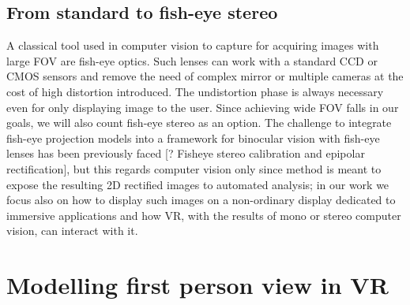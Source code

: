 \subsection{From standard to fish-eye stereo}
A classical tool used in computer vision to capture for acquiring images with large FOV are fish-eye optics. Such lenses can work with a standard CCD or CMOS sensors and remove the need of complex mirror or multiple cameras at the cost of high distortion introduced. The undistortion phase is always necessary even for only displaying image to the user. Since achieving wide FOV falls in our goals, we will also count fish-eye stereo as an option. The challenge to integrate fish-eye projection models into a framework for binocular vision with fish-eye lenses has been previously faced [? Fisheye stereo calibration and epipolar rectification], but this regards computer vision only since method is meant to expose the resulting 2D rectified images to automated analysis; in our work we focus also on how to display such images on a non-ordinary display dedicated to immersive applications and how VR, with the results of mono or stereo computer vision, can interact with it.

\section{Modelling first person view in VR}

